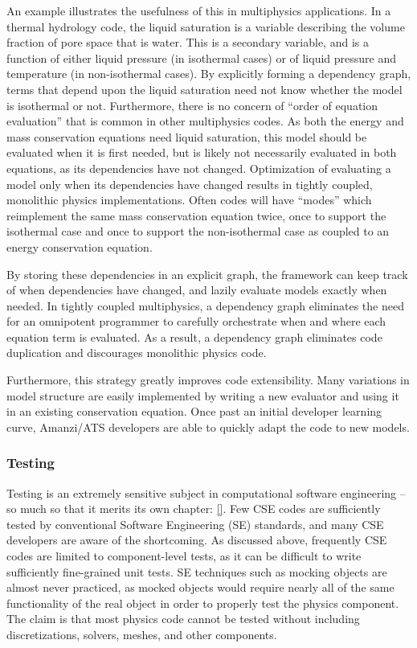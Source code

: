 An example illustrates the usefulness of this in multiphysics applications.
In a thermal hydrology code, the liquid saturation is a variable describing the volume fraction of pore space that is water.
This is a secondary variable, and is a function of either liquid pressure (in isothermal cases) or of liquid pressure and temperature (in non-isothermal cases).
By explicitly forming a dependency graph, terms that depend upon the liquid saturation need not know whether the model is isothermal or not.
Furthermore, there is no concern of ``order of equation evaluation'' that is common in other multiphysics codes.
As both the energy and mass conservation equations need liquid saturation, this model should be evaluated when it is first needed, but is likely not necessarily evaluated in both equations, as its dependencies have not changed.
Optimization of evaluating a model only when its dependencies have changed results in tightly coupled, monolithic physics implementations.
Often codes will have ``modes'' which reimplement the same mass conservation equation twice, once to support the isothermal case and once to support the non-isothermal case as coupled to an energy conservation equation.

By storing these dependencies in an explicit graph, the framework can keep track of when dependencies have changed, and lazily evaluate models exactly when needed.
In tightly coupled multiphysics, a dependency graph eliminates the need for an omnipotent programmer to carefully orchestrate when and where each equation term is evaluated.
As a result, a dependency graph eliminates code duplication and discourages monolithic physics code.

Furthermore, this strategy greatly improves code extensibility.
Many variations in model structure are easily implemented by writing a new evaluator and using it in an existing conservation equation.
Once past an initial developer learning curve, Amanzi/ATS developers are able to quickly adapt the code to new models.

\subsubsection{Testing}
\label{sec:amanzi:testing}
%
Testing is an extremely sensitive subject in computational software engineering -- so much so that it merits its own chapter: \ref{}.
Few CSE codes are sufficiently tested by conventional Software Engineering (SE) standards, and many CSE developers are aware of the shortcoming.
As discussed above, frequently CSE codes are limited to component-level tests, as it can be difficult to write sufficiently fine-grained unit tests.
SE techniques such as mocking objects are almost never practiced, as mocked objects would require nearly all of the same functionality of the real object in order to properly test the physics component.
The claim is that most physics code cannot be tested without including discretizations, solvers, meshes, and other components.

